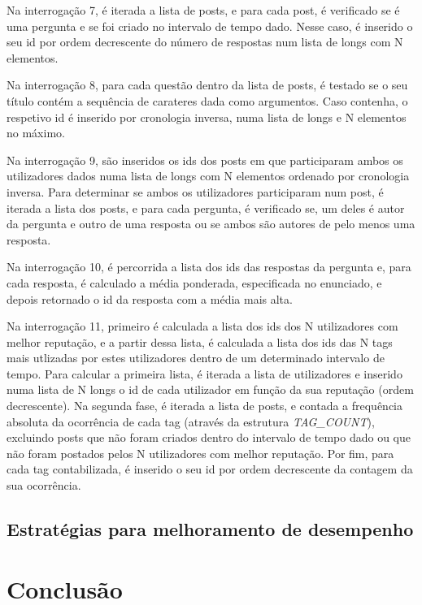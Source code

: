 \documentclass[10pt]{report}
\begin{document}
Na interrogação 7, é iterada a lista de posts, e para cada post, é verificado se é uma pergunta e se foi criado no intervalo de tempo dado. Nesse caso, é inserido o seu id por ordem decrescente do número de respostas num lista de longs com N elementos.

Na interrogação 8, para cada questão dentro da lista de posts, é testado se o seu título contém a sequência de carateres dada como argumentos. Caso contenha, o respetivo id é inserido por cronologia inversa, numa lista de longs e N elementos no máximo.

Na interrogação 9, são inseridos os ids dos posts em que participaram ambos os utilizadores dados numa lista de longs com N elementos ordenado por cronologia inversa. Para determinar se ambos os utilizadores participaram num post, é iterada a lista dos posts, e para cada pergunta, é verificado se, um deles é autor da pergunta e outro de uma resposta ou se ambos são autores de pelo menos uma resposta.

Na interrogação 10, é percorrida a lista dos ids das respostas da pergunta e, para cada resposta, é calculado a média ponderada, especificada no enunciado, e depois retornado o id da resposta com a média mais alta.

Na interrogação 11, primeiro é calculada a lista dos ids dos N utilizadores com melhor reputação, e a partir dessa lista, é calculada a lista dos ids das N tags mais utlizadas por estes utilizadores dentro de um determinado intervalo de tempo. Para calcular a primeira lista, é iterada a lista de utilizadores e inserido numa lista de N longs o id de cada utilizador em função da sua reputação (ordem decrescente). Na segunda fase, é iterada a lista de posts, e contada a frequência absoluta da ocorrência de cada tag (através da estrutura \textit{TAG\_COUNT}), excluindo posts que não foram criados dentro do intervalo de tempo dado ou que não foram postados pelos N utilizadores com melhor reputação. Por fim, para cada tag contabilizada, é inserido o seu id por ordem decrescente da contagem da sua ocorrência.

\section{Estratégias para melhoramento de desempenho}

\chapter{Conclusão}
\label{sec:conclusao}
\end{document}
